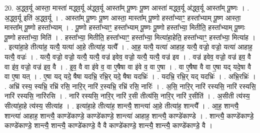 \documentclass[17pt]{extarticle}
\begin{document}
20. अ॒द्ध्व॒र्यू आस्ता॒ मास्ता॑ मद्ध्व॒र्यू अ॑द्ध्व॒र्यू आस्ता᳚म् पू॒ष्णः पू॒ष्ण आस्ता॑ मद्ध्व॒र्यू अ॑द्ध्व॒र्यू आस्ता᳚म् पू॒ष्णः । . अ॒द्ध्व॒र्यू इति॑ अ॒द्ध्व॒र्यू । . आस्ता᳚म् पू॒ष्णः पू॒ष्ण आस्ता॒ मास्ता᳚म् पू॒ष्णो हस्ता᳚भ्याꣳ॒॒ हस्ता᳚भ्याम् पू॒ष्ण आस्ता॒ मास्ता᳚म् पू॒ष्णो हस्ता᳚भ्याम् । . पू॒ष्णो हस्ता᳚भ्याꣳ॒॒ हस्ता᳚भ्याम् पू॒ष्णः पू॒ष्णो हस्ता᳚भ्या॒ मितीति॒ हस्ता᳚भ्याम् पू॒ष्णः पू॒ष्णो हस्ता᳚भ्या॒ मिति॑ । . हस्ता᳚भ्या॒ मितीति॒ हस्ता᳚भ्याꣳ॒॒ हस्ता᳚भ्या॒ मित्या॑हा॒हेति॒ हस्ता᳚भ्याꣳ॒॒ हस्ता᳚भ्या॒ मित्या॑ह । . इत्या॑हा॒हे तीत्या॑ह॒ यत्यै॒ यत्या॑ आ॒हे तीत्या॑ह॒ यत्यै᳚ । . आ॒ह॒ यत्यै॒ यत्या॑ आहाह॒ यत्यै॒ वज्रो॒ वज्रो॒ यत्या॑ आहाह॒ यत्यै॒ वज्रः॑ । . यत्यै॒ वज्रो॒ वज्रो॒ यत्यै॒ यत्यै॒ वज्र॑ इवेव॒ वज्रो॒ यत्यै॒ यत्यै॒ वज्र॑ इव । . वज्र॑ इवेव॒ वज्रो॒ वज्र॑ इव॒ वै वा इ॑व॒ वज्रो॒ वज्र॑ इव॒ वै । . इ॒व॒ वै वा इ॑वे व॒ वा ए॒षैषा वा इ॑वे व॒ वा ए॒षा । . वा ए॒षैषा वै वा ए॒षा यद् यदे॒षा वै वा ए॒षा यत् । . ए॒षा यद् यदे॒ षैषा यदभ्रि॒ रभ्रि॒र् यदे॒ षैषा यदभ्रिः॑ । . यदभ्रि॒ रभ्रि॒र् यद् यदभ्रिः॑ । . अभ्रि॒रभ्रिः॑ । . अभ्रि॑ रस्य॒ स्यभ्रि॒ रभ्रि॑ रसि॒ नारि॒र् नारि॑ र॒स्यभ्रि॒ रभ्रि॑ रसि॒ नारिः॑ । . अ॒सि॒ नारि॒र् नारि॑ रस्यसि॒ नारि॑ रस्यसि॒ नारि॑ रस्यसि॒ नारि॑रसि । . नारि॑ रस्यसि॒ नारि॒र् नारि॑ र॒सी तीत्य॑सि॒ नारि॒र् नारि॑ र॒सीति॑ । . अ॒सीती त्य॑स्य॒ सीत्या॑हा॒हे त्य॑स्य॒ सीत्या॑ह । . इत्या॑हा॒हे तीत्या॑ह॒ शान्त्यै॒ शान्त्या॑ आ॒हे तीत्या॑ह॒ शान्त्यै᳚ । . आ॒ह॒ शान्त्यै॒ शान्त्या॑ आहाह॒ शान्त्यै॒ काण्डे॑काण्डे॒ काण्डे॑काण्डे॒ शान्त्या॑ आहाह॒ शान्त्यै॒ काण्डे॑काण्डे । . शान्त्यै॒ काण्डे॑काण्डे॒ काण्डे॑काण्डे॒ शान्त्यै॒ शान्त्यै॒ काण्डे॑काण्डे॒ वै वै काण्डे॑काण्डे॒ शान्त्यै॒ शान्त्यै॒ काण्डे॑काण्डे॒ वै । \newline
\end{document}
